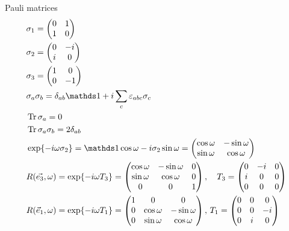 \documentclass{article}
\begin{document}
Pauli matrices
\begin{align}
    &\sigma_1 =\begin{pmatrix}
        0 & 1\\ 1 & 0
    \end{pmatrix}\\
    &\sigma_2 = \begin{pmatrix}
        0& -i \\ i & 0
    \end{pmatrix} \\
    &\sigma_3 = \begin{pmatrix}
    1 & 0 \\ 0 & -1
    \end{pmatrix}\\
    &\sigma_a \sigma_b = \delta_{ab} \id + i\sum_c
    \varepsilon_{abc}\sigma_c \\
    &\Tr{\sigma_a} =0 \\
    &\Tr{\sigma_a \sigma_b} =2\delta_{ab} \\
    &\exp{-i\omega \sigma_2} =\id \cos{\omega}-i\sigma_2\sin{\omega}
    = \begin{pmatrix}
        \cos{\omega} & -\sin{\omega} \\
        \sin{\omega} & \cos{\omega}
    \end{pmatrix} \\
    &R(\vec{e_3},\omega)= \exp{-i\omega T_3}= \begin{pmatrix}
        \cos{\omega} & -\sin{\omega} & 0 \\
        \sin{\omega} & \cos{\omega} & 0 \\
        0 & 0 & 1
    \end{pmatrix},\quad T_3 = \begin{pmatrix}
        0 & -i & 0 \\
        i & 0 & 0 \\
        0 & 0 & 0
    \end{pmatrix} \\
    & R(\vec{e}_1,\omega) = \exp{-i\omega T_1} = \begin{pmatrix}
        1 & 0 & 0 \\
        0 & \cos{\omega} & -\sin{\omega} \\
        0 & \sin{\omega} & \cos{\omega} 
    \end{pmatrix},\, T_1 = \begin{pmatrix}
        0 & 0 & 0 \\
        0 & 0 & -i \\
        0 & i & 0

\end{pmatrix}
\end{align}
\end{document}
